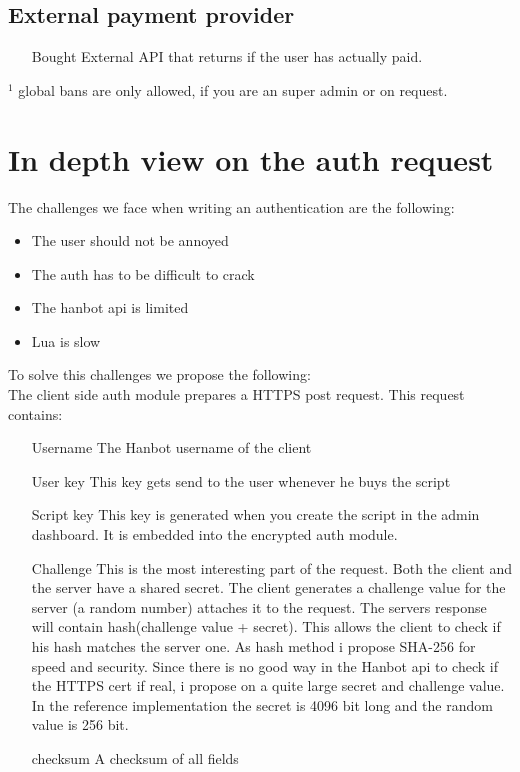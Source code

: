 \documentclass{article}
\begin{document}
\subsection{External payment provider}
\begin{itemize}
	\item[Bought] External API that returns if the user has actually paid.
\end{itemize}
$^1$ global bans are only allowed, if you are an super admin or on request.

\section{In depth view on the auth request}
The challenges we face when writing an authentication are the following:
\begin{itemize}
	\item The user should not be annoyed
	\item The auth has to be difficult to crack
	\item The hanbot api is limited
	\item Lua is slow
\end{itemize}
To solve this challenges we propose the following:\\
The client side auth module prepares a HTTPS post request.
This request contains:
\begin{itemize}
	\item[Username] The Hanbot username of the client
	\item[User key] This key gets send to the user whenever he buys the script
	\item[Script key] This key is generated when you create the script in the admin dashboard. It is embedded into the encrypted auth module.
	\item[Challenge] This is the most interesting part of the request. Both the client and the server have a shared secret. The client generates a challenge value for the server (a random number) attaches it to the request. The servers response will contain hash(challenge value + secret). This allows the client to check if his hash matches the server one.
	As hash method i propose SHA-256 for speed and security.
	Since there is no good way in the Hanbot api to check if the HTTPS cert if real, i propose on a quite large secret and challenge value. In the reference implementation the secret is 4096 bit long and the random value is 256 bit.
	\item[checksum] A checksum of all fields
\end{itemize}
\end{document}
